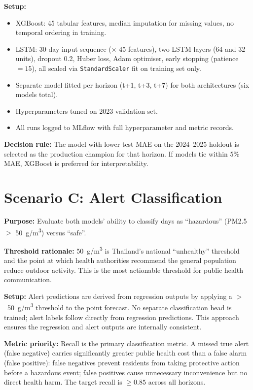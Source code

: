 \documentclass[12pt,a4paper]{report}
\begin{document}
\textbf{Setup:}
\begin{itemize}
  \item XGBoost: 45 tabular features, median imputation for missing values, no temporal ordering in training.
  \item LSTM: 30-day input sequence ($\times$ 45 features), two LSTM layers (64 and 32 units), dropout 0.2, Huber loss, Adam optimiser, early stopping (patience~$= 15$), all scaled via \texttt{StandardScaler} fit on training set only.
  \item Separate model fitted per horizon (t+1, t+3, t+7) for both architectures (six models total).
  \item Hyperparameters tuned on 2023 validation set.
  \item All runs logged to MLflow with full hyperparameter and metric records.
\end{itemize}

\textbf{Decision rule:} The model with lower test MAE on the 2024--2025 holdout is selected as the production champion for that horizon. If models tie within 5\% MAE, XGBoost is preferred for interpretability.

\section{Scenario C: Alert Classification}

\textbf{Purpose:} Evaluate both models' ability to classify days as ``hazardous'' (PM2.5 ${>}$ 50~\textmu g/m\textsuperscript{3}) versus ``safe''.

\textbf{Threshold rationale:} 50~\textmu g/m\textsuperscript{3} is Thailand's national ``unhealthy'' threshold and the point at which health authorities recommend the general population reduce outdoor activity. This is the most actionable threshold for public health communication.

\textbf{Setup:} Alert predictions are derived from regression outputs by applying a ${>}$~50~\textmu g/m\textsuperscript{3} threshold to the point forecast. No separate classification head is trained; alert labels follow directly from regression predictions. This approach ensures the regression and alert outputs are internally consistent.

\textbf{Metric priority:} Recall is the primary classification metric. A missed true alert (false negative) carries significantly greater public health cost than a false alarm (false positive): false negatives prevent residents from taking protective action before a hazardous event; false positives cause unnecessary inconvenience but no direct health harm. The target recall is $\geq 0.85$ across all horizons.
\end{document}
